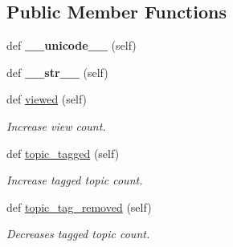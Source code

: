 \subsection*{Public Member Functions}
\begin{DoxyCompactItemize}
\item 
\hypertarget{class_meanco_app_1_1models_1_1tag_1_1_tag_afd68112d03db27df450f4eca7e732b1e}{}\label{class_meanco_app_1_1models_1_1tag_1_1_tag_afd68112d03db27df450f4eca7e732b1e} 
def {\bfseries \+\_\+\+\_\+unicode\+\_\+\+\_\+} (self)
\item 
\hypertarget{class_meanco_app_1_1models_1_1tag_1_1_tag_a2aaa3268b75dfc8072665c1d1e315529}{}\label{class_meanco_app_1_1models_1_1tag_1_1_tag_a2aaa3268b75dfc8072665c1d1e315529} 
def {\bfseries \+\_\+\+\_\+str\+\_\+\+\_\+} (self)
\item 
\hypertarget{class_meanco_app_1_1models_1_1tag_1_1_tag_a3325808120df7a072aa2f8c5b4e4c372}{}\label{class_meanco_app_1_1models_1_1tag_1_1_tag_a3325808120df7a072aa2f8c5b4e4c372} 
def \hyperlink{class_meanco_app_1_1models_1_1tag_1_1_tag_a3325808120df7a072aa2f8c5b4e4c372}{viewed} (self)
\begin{DoxyCompactList}\small\item\em Increase view count. \end{DoxyCompactList}\item 
def \hyperlink{class_meanco_app_1_1models_1_1tag_1_1_tag_aa38cc1143437c5e7d0d9cdeb90d93207}{topic\+\_\+tagged} (self)
\begin{DoxyCompactList}\small\item\em Increase tagged topic count. \end{DoxyCompactList}\item 
def \hyperlink{class_meanco_app_1_1models_1_1tag_1_1_tag_a78431fe5802b73e1adef412f7f47d5b0}{topic\+\_\+tag\+\_\+removed} (self)
\begin{DoxyCompactList}\small\item\em Decreases tagged topic count. \end{DoxyCompactList}\end{DoxyCompactItemize}

